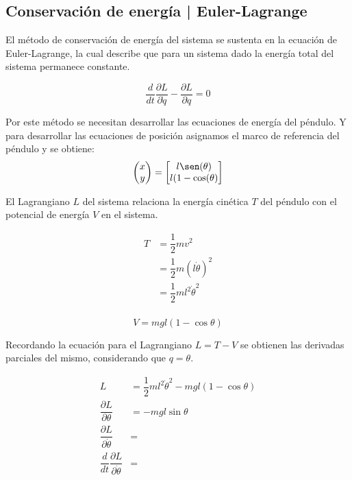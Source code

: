 \subsection{Conservación de energía | Euler-Lagrange}

El método de conservación de energía del sistema se sustenta
en la ecuación de Euler-Lagrange, la cual describe que para un
sistema dado la energía total del sistema permanece constante.

\begin{equation}
 \dfrac{d}{dt} \dfrac{\partial L}{\partial \dot{q}} - 
 \dfrac{\partial L}{\partial q} = 0
 \label{eq: euler lagrange equation}
\end{equation}


Por este método se necesitan desarrollar las ecuaciones de energía del péndulo. Y para desarrollar las ecuaciones de posición asignamos el marco de referencia del péndulo y se obtiene:\\
\begin{equation}
\left(\begin{matrix}
x\\
y
\end{matrix}\right) = 
\begin{bmatrix}
l\sen(\theta)\\
l(1 - \cos(\theta)
\end{bmatrix}
\end{equation}


El Lagrangiano $L$ del sistema relaciona la energía cinética $T$ 
del péndulo con el potencial de energía $V$ en el sistema.

\begin{equation*}
\begin{split}
 T &= \dfrac{1}{2} m v^2\\
 &= \dfrac{1}{2} m (l\dot{\theta})^2\\
 &= \dfrac{1}{2} m l^2 \dot{\theta}^2\\
\end{split}
\label{eq: kinetic energy}
\end{equation*}

\begin{equation*}
 V = m g l \left( 1 - \cos{\theta} \right)
 \label{eq: potential energy}
\end{equation*}

Recordando la ecuación para el Lagrangiano $L = T - V$ se obtienen las 
derivadas parciales del mismo, considerando que $q = \theta$.

\begin{equation}
 \begin{split}
  L & = \dfrac{1}{2}m l^2 \dot{\theta}^2 - m g l (1 - \cos{\theta})\\
  \dfrac{\partial L}{\partial \theta} &= - m g l \sin{\theta} \\
  \dfrac{\partial L}{\partial \dot{\theta}} &=\\
  \dfrac{d}{dt}\dfrac{\partial L}{\partial \dot{\theta}} &=\\
 \end{split}
\end{equation}

